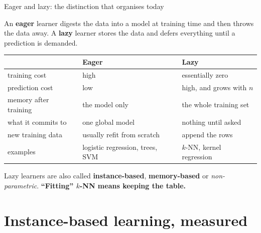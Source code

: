 \documentclass[aspectratio=169]{beamer}
\begin{document}
\begin{frame}[shrink=6]{Eager and lazy: the distinction that organises today}
  \begin{exampleblock}{}
    \centering\small
    An \textbf{eager} learner digests the data into a model at training time
    and then throws the data away. A \textbf{lazy} learner stores the data and
    defers everything until a prediction is demanded.
  \end{exampleblock}
  \begin{center}\small
  \begin{tabular}{@{}lll@{}}
    \toprule
     & \textbf{Eager} & \textbf{Lazy}\\
    \midrule
    training cost & high & essentially zero\\
    prediction cost & low & high, and grows with $n$\\
    memory after training & the model only & the whole training set\\
    what it commits to & one global model & nothing until asked\\
    new training data & usually refit from scratch & append the rows\\
    examples & logistic regression, trees, SVM & $k$-NN, kernel regression\\
    \bottomrule
  \end{tabular}
  \end{center}
  \begin{center}\small
    Lazy learners are also called \textbf{instance-based}, \textbf{memory-based}
    or \emph{non-parametric}. \textbf{``Fitting'' $k$-NN means keeping the
    table.}
  \end{center}
\end{frame}

\section[Instance-based]{Instance-based learning, measured}
\label{sec:lazy}
\end{document}
